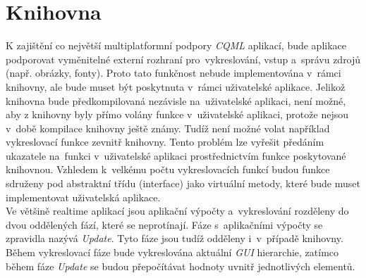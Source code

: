 \documentclass[11pt,twoside,a4paper]{book}
\begin{document}
\section{\label{SEC:libI}Knihovna}
K zajištění co největší multiplatformní podpory \textit{CQML} aplikací, bude aplikace podporovat vyměnitelné externí rozhraní pro~vykreslování, vstup a~správu zdrojů (např. obrázky, fonty). Proto tato funkčnost nebude implementována v~rámci knihovny, ale bude muset být poskytnuta v~rámci uživatelské aplikace. 
Jelikož knihovna bude předkompilovaná nezávisle na~uživatelské aplikaci, není možné, aby z knihovny byly přímo volány funkce v~uživatelské aplikaci, protože nejsou v~době kompilace knihovny ještě známy. Tudíž není možné volat například vykreslovací funkce zevnitř knihovny. Tento problém lze vyřešit předáním ukazatele na~funkci v~uživatelské aplikaci prostřednictvím funkce poskytované knihovnou. Vzhledem k~velkému počtu vykreslovacích funkcí budou funkce sdruženy pod abstraktní třídu (interface) jako virtuální metody, které bude muset implementovat uživatelská aplikace.\\
Ve většině realtime aplikací jsou aplikační výpočty a~vykreslování rozděleny do dvou oddělených fází, které se neprotínají. Fáze s~aplikačními výpočty se zpravidla nazývá \textit{Update}. Tyto fáze jsou tudíž odděleny i~v~případě knihovny. Během vykreslovací fáze bude vykreslována aktuální \textit{GUI} hierarchie, zatímco během fáze \textit{Update} se budou přepočítávat hodnoty uvnitř jednotlivých elementů.\\
\end{document}
